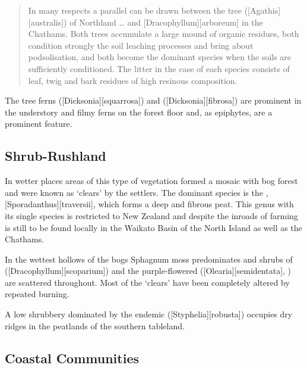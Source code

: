 \begin{quote}
	In many respects a parallel can be drawn between the  tree ([Agathis][australis]) of Northland … and [Dracophyllum][arboreum] in the Chathams.
	Both trees accumulate a large mound of organic residues, both condition strongly the soil leaching processes and bring about podsolisation, and both become the dominant species when the soils are sufficiently conditioned.
	The litter in the case of each species consists of leaf, twig and bark residues of high resinous composition.
\end{quote}

The tree ferns  ([Dicksonia][squarrosa]) and  ([Dicksonia][fibrosa]) are prominent in the understory and filmy ferns on the forest floor and, as epiphytes, are a prominent feature.

\subsection{Shrub-Rushland}

In wetter places areas of this type of vegetation formed a mosaic with bog forest and were known as `clears' by the settlers.
The dominant species is the , [Sporadanthus][traversii], which forms a deep and fibrous peat.
This genus with its single species is restricted to New Zealand and despite the inroads of farming is still to be found locally in the Waikato Basin of the North Island as well as the Chathams.

In the wettest hollows of the bogs Sphagnum moss predominates and shrubs of  ([Dracophyllum][scoparium]) and the purple-flowered  ([Olearia][semidentata], ) are scattered throughout.
Most of the `clears' have been completely altered by repeated burning.

A low shrubbery dominated by the endemic  ([Styphelia][robusta]) occupies dry ridges in the peatlands of the southern tableland.

\subsection{Coastal Communities}

